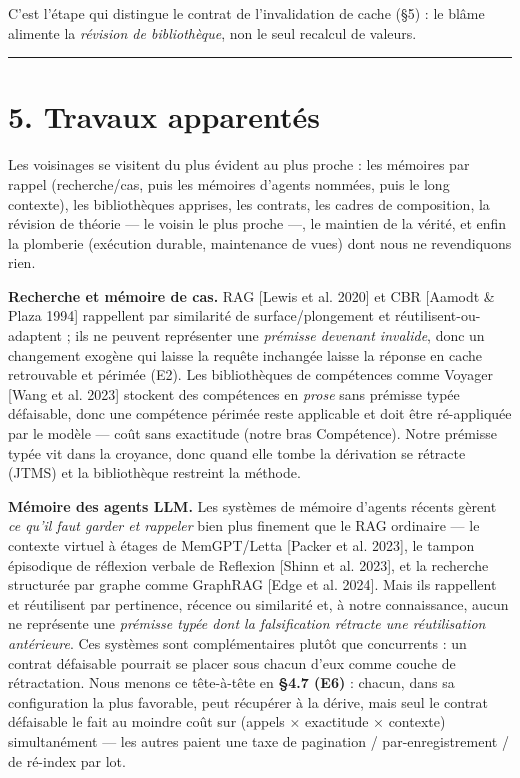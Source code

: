 \documentclass[11pt]{article}
\begin{document}
C'est l'étape qui distingue le contrat de l'invalidation de cache (§5) : le blâme alimente la \emph{révision de bibliothèque}, non le seul recalcul de valeurs.

\medskip\hrule\medskip

\section*{5. Travaux apparentés}

Les voisinages se visitent du plus évident au plus proche : les mémoires par rappel (recherche/cas, puis les mémoires d'agents nommées, puis le long contexte), les bibliothèques apprises, les contrats, les cadres de composition, la révision de théorie — le voisin le plus proche —, le maintien de la vérité, et enfin la plomberie (exécution durable, maintenance de vues) dont nous ne revendiquons rien.

\textbf{Recherche et mémoire de cas.} RAG [Lewis et al. 2020] et CBR [Aamodt \& Plaza 1994] rappellent par similarité de surface/plongement et réutilisent-ou-adaptent ; ils ne peuvent représenter une \emph{prémisse devenant invalide}, donc un changement exogène qui laisse la requête inchangée laisse la réponse en cache retrouvable et périmée (E2). Les bibliothèques de compétences comme Voyager [Wang et al. 2023] stockent des compétences en \emph{prose} sans prémisse typée défaisable, donc une compétence périmée reste applicable et doit être ré-appliquée par le modèle — coût sans exactitude (notre bras Compétence). Notre prémisse typée vit dans la croyance, donc quand elle tombe la dérivation se rétracte (JTMS) et la bibliothèque restreint la méthode.

\textbf{Mémoire des agents LLM.} Les systèmes de mémoire d'agents récents gèrent \emph{ce qu'il faut garder et rappeler} bien plus finement que le RAG ordinaire — le contexte virtuel à étages de MemGPT/Letta [Packer et al. 2023], le tampon épisodique de réflexion verbale de Reflexion [Shinn et al. 2023], et la recherche structurée par graphe comme GraphRAG [Edge et al. 2024]. Mais ils rappellent et réutilisent par pertinence, récence ou similarité et, à notre connaissance, aucun ne représente une \emph{prémisse typée dont la falsification rétracte une réutilisation antérieure}. Ces systèmes sont complémentaires plutôt que concurrents : un contrat défaisable pourrait se placer sous chacun d'eux comme couche de rétractation. Nous menons ce tête-à-tête en \textbf{§4.7 (E6)} : chacun, dans sa configuration la plus favorable, peut récupérer à la dérive, mais seul le contrat défaisable le fait au moindre coût sur (appels × exactitude × contexte) simultanément — les autres paient une taxe de pagination / par-enregistrement / de ré-index par lot.
\end{document}
